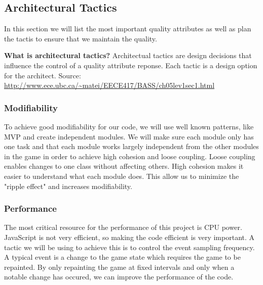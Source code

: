 \subsection{Architectural Tactics}
In this section we will list the most important quality attributes as well as plan the tactis to 
ensure that we maintain the quality.

{\bf What is architectural tactics? }
Architectual tactics are design decisions that influence the control of a quality attribute reponse. 
Each tactic is a design option for the architect. 
Source: \url{http://www.ece.ubc.ca/~matei/EECE417/BASS/ch05lev1sec1.html}

\subsubsection{Modifiability}
To achieve good modifiability for our code, we will use well known patterns, like MVP and create 
independent modules. We will make sure each module only has one task and that each module works 
largely independent from the other modules in the game in order to achieve high cohesion and loose 
coupling. Loose coupling enables changes to one class without affecting others. High cohesion makes 
it easier to understand what each module does. This allow us to minimize the "ripple effect" and 
increases modifiability.

\subsubsection{Performance}
The most critical resource for the performance of this project is CPU power. JavaScript is not very 
efficient, so making the code efficient is very important. A tactic we will be using to achieve this 
is to control the event sampling frequency. A typical event is a change to the game state which 
requires the game to be repainted. By only repainting the game at fixed intervals and only when a 
notable change has occured, we can improve the performance of the code.